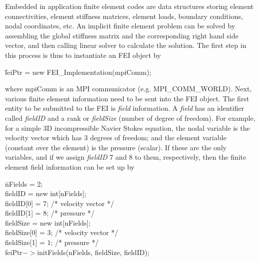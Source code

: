 Embedded in application finite element codes are data structures
storing element connectivities, element stiffness matrices, element
loads, boundary conditions, nodal coordinates, etc. An implicit finite
element problem can be solved by assembling the global stiffness matrix
and the corresponding right hand side vector, and then calling linear
solver to calculate the solution. The first step in this process is
thus to instantiate an FEI object by
\begin{tabbing}
\hspace{0.5in} \= {\sf feiPtr = new FEI\_Implementation(mpiComm);}
\end{tabbing}
where {\sf mpiComm} is an MPI communicator (e.g. {\sf MPI\_COMM\_WORLD}).
Next, various finite element information need to be sent into the FEI
object.  The first entity to be submitted to the FEI is {\it field}
information.  A {\it field} has an identifier called {\it fieldID} and
a rank or {\it fieldSize} (number of degree of freedom). For example,
for a simple 3D incompressible Navier Stokes equation, the nodal variable
is the velocity vector which has $3$ degrees of freedom; and the element
variable (constant over the element) is the pressure (scalar). If these
are the only variables, and if we assign {\it fieldID} $7$ and $8$ to
them, respectively, then the finite element field information can be set
up by
\begin{tabbing}
\hspace{0.5in} \= {\sf nFields = 2;} \\
               \> {\sf fieldID = new int[nFields];} \\
               \> {\sf fieldID[0] = $7$; /* velocity vector */} \\
               \> {\sf fieldID[1] = $8$; /* pressure */} \\
               \> {\sf fieldSize = new int[nFields];} \\
               \> {\sf fieldSize[0] = $3$; /* velocity vector */} \\
               \> {\sf fieldSize[1] = $1$; /* pressure */ } \\
               \> {\sf feiPtr$->$initFields(nFields, fieldSize, fieldID);}
\end{tabbing}
                                                                                
